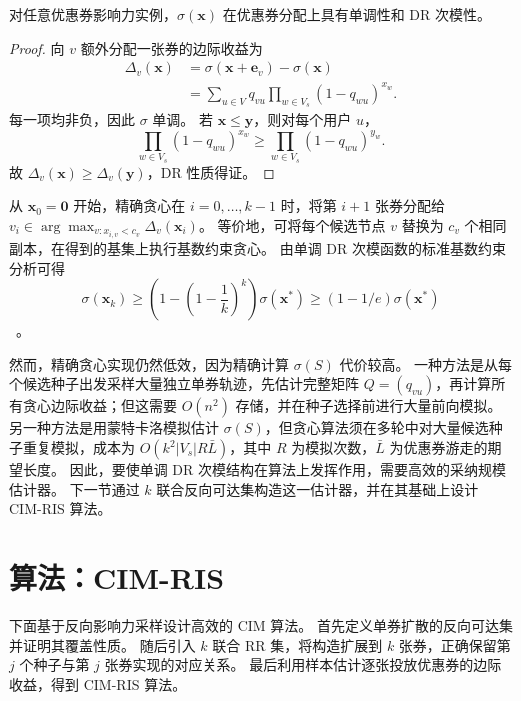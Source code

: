 \documentclass[sigconf,balance=false]{acmart}
\newcommand{\CIMRIS}{\textsc{CIM-RIS}}
\begin{document}
\begin{theorem}
\label{thm:monosub}
对任意优惠券影响力实例，$\sigma(\bm{x})$ 在优惠券分配上具有单调性和 DR 次模性。
\end{theorem}

\begin{proof}
向 $v$ 额外分配一张券的边际收益为
\begin{align*}
  \Delta_v(\bm{x})
  &=\sigma(\bm{x}+\bm{e}_v)-\sigma(\bm{x})\\
  &=\sum_{u\in V}q_{vu}
    \prod_{w\in V_s}(1-q_{wu})^{x_w}.
\end{align*}
每一项均非负，因此 $\sigma$ 单调。
若 $\bm{x}\leq\bm{y}$，则对每个用户 $u$，
\[
  \prod_{w\in V_s}(1-q_{wu})^{x_w}
  \geq
  \prod_{w\in V_s}(1-q_{wu})^{y_w}.
\]
故 $\Delta_v(\bm{x})\geq\Delta_v(\bm{y})$，DR 性质得证。
\end{proof}

从 $\bm{x}_0=\bm{0}$ 开始，精确贪心在 $i=0,\ldots,k-1$ 时，将第 $i+1$ 张券分配给 $v_i\in\arg\max_{v:x_{i,v}<c_v}\Delta_v(\bm{x}_i)$。
等价地，可将每个候选节点 $v$ 替换为 $c_v$ 个相同副本，在得到的基集上执行基数约束贪心。
由单调 DR 次模函数的标准基数约束分析可得
\[
  \sigma(\bm{x}_k)
  \geq \left(1-\left(1-\frac{1}{k}\right)^k\right)\sigma(\bm{x}^*)
  \geq (1-1/e)\sigma(\bm{x}^*)
\]
~\cite{nemhauser1978analysis}。

然而，精确贪心实现仍然低效，因为精确计算 $\sigma(S)$ 代价较高。
一种方法是从每个候选种子出发采样大量独立单券轨迹，先估计完整矩阵 $Q=(q_{vu})$，再计算所有贪心边际收益；但这需要 $O(n^2)$ 存储，并在种子选择前进行大量前向模拟。
另一种方法是用蒙特卡洛模拟估计 $\sigma(S)$，但贪心算法须在多轮中对大量候选种子重复模拟，成本为 $O(k^2 |V_s|R\bar{L})$，其中 $R$ 为模拟次数，$\bar{L}$ 为优惠券游走的期望长度。
因此，要使单调 DR 次模结构在算法上发挥作用，需要高效的采纳规模估计器。
下一节通过 $k$ 联合反向可达集构造这一估计器，并在其基础上设计 \CIMRIS{} 算法。

\section{算法：\CIMRIS{}}
\label{sec:algo}

下面基于反向影响力采样设计高效的 CIM 算法。
首先定义单券扩散的反向可达集并证明其覆盖性质。
随后引入 $k$ 联合 RR 集，将构造扩展到 $k$ 张券，正确保留第 $j$ 个种子与第 $j$ 张券实现的对应关系。
最后利用样本估计逐张投放优惠券的边际收益，得到 \CIMRIS{} 算法。
\end{document}
